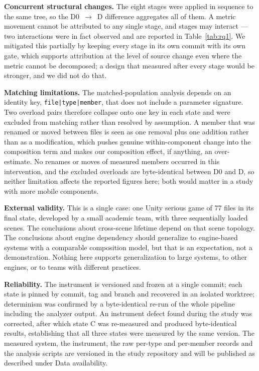 \documentclass[pdflatex,sn-basic]{sn-jnl}
\begin{document}
\medskip\noindent\textbf{Concurrent structural changes.} The eight stages were applied in sequence to the same tree, so the D0~$\rightarrow$~D difference aggregates all of them. A metric movement cannot be attributed to any single stage, and stages may interact --- two interactions were in fact observed and are reported in Table~\ref{tab:rq1}. We mitigated this partially by keeping every stage in its own commit with its own gate, which supports attribution at the level of source change even where the metric cannot be decomposed; a design that measured after every stage would be stronger, and we did not do that.

\medskip\noindent\textbf{Matching limitations.} The matched-population analysis depends on an identity key, \texttt{file|type|member}, that does not include a parameter signature. Two overload pairs therefore collapse onto one key in each state and were excluded from matching rather than resolved by assumption. A member that was renamed or moved between files is seen as one removal plus one addition rather than as a modification, which pushes genuine within-component change into the composition term and makes our composition effect, if anything, an over-estimate. No renames or moves of measured members occurred in this intervention, and the excluded overloads are byte-identical between D0 and D, so neither limitation affects the reported figures here; both would matter in a study with more mobile components.

\medskip\noindent\textbf{External validity.} This is a single case: one Unity serious game of 77 files in its final state, developed by a small academic team, with three sequentially loaded scenes. The conclusions about cross-scene lifetime depend on that scene topology. The conclusions about engine dependency should generalize to engine-based systems with a comparable composition model, but that is an expectation, not a demonstration. Nothing here supports generalization to large systems, to other engines, or to teams with different practices.

\medskip\noindent\textbf{Reliability.} The instrument is versioned and frozen at a single commit; each state is pinned by commit, tag and branch and recovered in an isolated worktree; determinism was confirmed by a byte-identical re-run of the whole pipeline including the analyzer output. An instrument defect found during the study was corrected, after which state C was re-measured and produced byte-identical results, establishing that all three states were measured by the same version. The measured system, the instrument, the raw per-type and per-member records and the analysis scripts are versioned in the study repository and will be published as described under Data availability.
\end{document}

